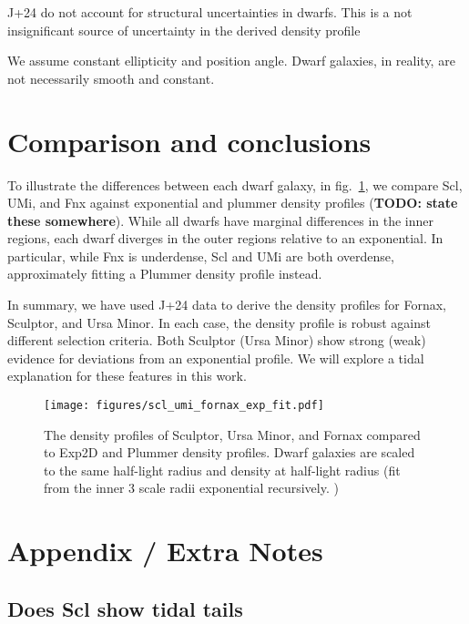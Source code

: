 J+24 do not account for structural uncertainties in dwarfs. This is a
not insignificant source of uncertainty in the derived density profile

We assume constant ellipticity and position angle. Dwarf galaxies, in
reality, are not necessarily smooth and constant.

\section{Comparison and conclusions}\label{comparison-and-conclusions}

To illustrate the differences between each dwarf galaxy, in
fig.~\ref{fig:classical_dwarfs_densities}, we compare Scl, UMi, and Fnx
against exponential and plummer density profiles (\textbf{TODO: state
these somewhere}). While all dwarfs have marginal differences in the
inner regions, each dwarf diverges in the outer regions relative to an
exponential. In particular, while Fnx is underdense, Scl and UMi are
both overdense, approximately fitting a Plummer density profile instead.

In summary, we have used J+24 data to derive the density profiles for
Fornax, Sculptor, and Ursa Minor. In each case, the density profile is
robust against different selection criteria. Both Sculptor (Ursa Minor)
show strong (weak) evidence for deviations from an exponential profile.
We will explore a tidal explanation for these features in this work.

\begin{figure}
\centering
\texttt{[image: figures/scl\_umi\_fornax\_exp\_fit.pdf]}
\caption[Classical dwarf density profiles]{The density profiles of
Sculptor, Ursa Minor, and Fornax compared to Exp2D and Plummer density
profiles. Dwarf galaxies are scaled to the same half-light radius and
density at half-light radius (fit from the inner 3 scale radii
exponential recursively. )}\label{fig:classical_dwarfs_densities}
\end{figure}

\section{Appendix / Extra Notes}\label{appendix-extra-notes}

\subsection{Does Scl show tidal tails}\label{does-scl-show-tidal-tails}

